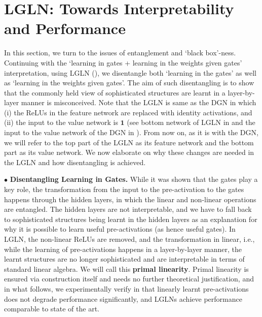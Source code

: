 \section{LGLN:  Towards Interpretability and Performance}\label{sec:lgln}
In this section, we turn to the issues of entanglement and `black box'-ness. Continuing with the `learning in gates + learning in the weights given gates' interpretation, using LGLN (), we disentangle both `learning in the gates' as well as `learning in the weights given gates'. The aim of such disentangling is to show that the commonly held view of sophisticated structures are learnt in a layer-by-layer manner is misconceived. Note that the LGLN is same as the DGN in which (i) the ReLUs in the feature network are replaced with identity activations, and (ii) the input to the value network is $\mathbf{1}$ (see bottom network of LGLN in  and the input to the value network of the DGN in ). From now on, as it is with the DGN, we will refer to the top part of the LGLN as its feature network and the bottom part as its value network.
We now elaborate on why these changes are needed in the LGLN and how disentangling is achieved.

$\bullet$ \textbf{Disentangling Learning in Gates.}  %
 While it was shown that \citep{npk} the gates play a key role, the transformation from the input to the pre-activation to the gates happens through the hidden layers, in which the linear and non-linear operations are entangled. The hidden layers are not interpretable, and we have to fall back to sophisticated structures being learnt in the hidden layers as an explanation for why it is possible to learn useful pre-activations (as hence useful gates). In LGLN, the non-linear ReLUs are removed, and the transformation in linear, i.e., while the learning of pre-activations happens in a layer-by-layer manner, the learnt structures are no longer sophisticated and are interpretable in terms of standard linear algebra. We will call this \textbf{primal linearity}. Primal linearity is ensured via construction itself and needs no further theoretical justification, and in what follows, we experimentally verify in  that linearly learnt pre-activations does not degrade performance significantly, and LGLNs achieve performance comparable to state of the art.

